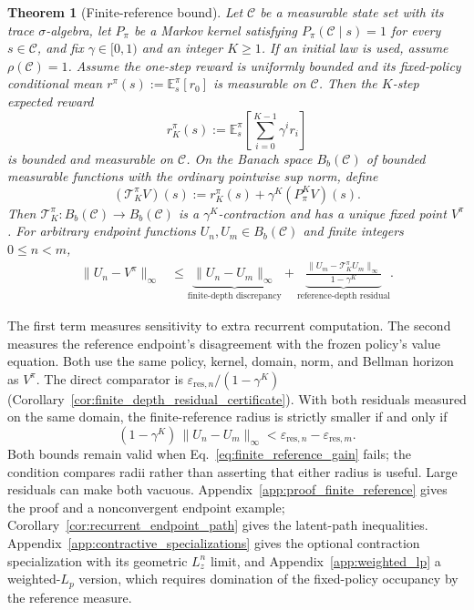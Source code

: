 \documentclass{article}
\theoremstyle{plain}
\newtheorem{theorem}{Theorem}[section]
\theoremstyle{definition}
\theoremstyle{remark}
\newcommand{\E}{\mathbb{E}}
\begin{document}
\begin{theorem}[Finite-reference bound]
\label{thm:finite_reference_depth}
Let $\mathcal C$ be a measurable state set with its trace $\sigma$-algebra,
let $P_\pi$ be a Markov kernel satisfying
$P_\pi(\mathcal C\mid s)=1$ for every $s\in\mathcal C$, and fix
$\gamma\in[0,1)$ and an integer $K\ge1$. If an initial law is used, assume
$\rho(\mathcal C)=1$. Assume the one-step reward is uniformly bounded and
its fixed-policy conditional mean
$r^\pi(s):=\E_s^\pi[r_0]$ is measurable on $\mathcal C$. Then the $K$-step
expected reward
\begin{equation}
r_K^\pi(s)
:=
\E_s^\pi\!\left[\sum_{i=0}^{K-1}\gamma^i r_i\right]
\label{eq:rK_definition}
\end{equation}
is bounded and measurable on $\mathcal C$. On the Banach space
$B_b(\mathcal C)$ of bounded measurable functions with the ordinary
pointwise sup norm, define
\begin{equation}
(\mathcal T_K^\pi V)(s)
:=
r_K^\pi(s)+\gamma^K(P_\pi^K V)(s).
\label{eq:TK_measurable}
\end{equation}
Then $\mathcal T_K^\pi:B_b(\mathcal C)\to B_b(\mathcal C)$ is a
$\gamma^K$-contraction and has a unique fixed point $V^\pi$. For arbitrary
endpoint functions $U_n,U_m\in B_b(\mathcal C)$ and finite integers
$0\le n<m$,
\begin{align}
\|U_n - V^\pi\|_\infty
&\le
\underbrace{\|U_n-U_m\|_\infty}_{\text{finite-depth discrepancy}}
+
\underbrace{\frac{\|U_m-\mathcal T_K^\pi U_m\|_\infty}{1-\gamma^K}}_{\text{reference-depth residual}}.
\label{eq:finite_reference_depth}
\end{align}

\end{theorem}

The first term measures sensitivity to extra recurrent computation. The
second measures the reference endpoint's disagreement with the frozen
policy's value equation. Both use the same policy, kernel, domain, norm, and
Bellman horizon as $V^\pi$. The direct comparator is
$\varepsilon_{\mathrm{res},n}/(1-\gamma^K)$
(Corollary~\ref{cor:finite_depth_residual_certificate}). With both residuals
measured on the same domain, the finite-reference radius is strictly smaller
if and only if
\begin{equation}
(1-\gamma^K)\,\|U_n-U_m\|_\infty
<\varepsilon_{\mathrm{res},n}-\varepsilon_{\mathrm{res},m}.
\label{eq:finite_reference_gain}
\end{equation}
Both bounds remain valid when Eq.~\eqref{eq:finite_reference_gain} fails; the
condition compares radii rather than asserting that either radius is useful.
Large residuals can make both vacuous.
Appendix~\ref{app:proof_finite_reference}
gives the proof and a nonconvergent endpoint example; Corollary~\ref{cor:recurrent_endpoint_path}
gives the latent-path inequalities. Appendix~\ref{app:contractive_specializations} gives the optional
contraction specialization with its geometric $L_z^n$ limit, and
Appendix~\ref{app:weighted_lp} a weighted-$L_p$ version, which requires
domination of the fixed-policy occupancy by the reference measure.
\end{document}
